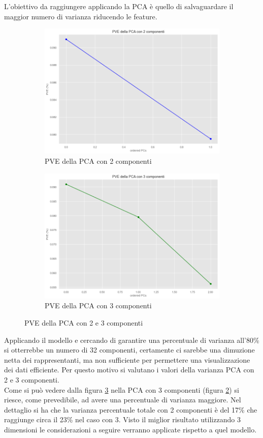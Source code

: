 L'obiettivo da raggiungere applicando la PCA è quello di salvaguardare il maggior numero di varianza riducendo le feature. 
\begin{figure}[h]
	\begin{subfigure}{.5\textwidth}
		\centering
		\includegraphics[width=.5\linewidth]{capitolo3/pca.png}
		\caption{PVE della PCA con 2 componenti}
		\label{fig:pca2d}
	\end{subfigure}%
	\begin{subfigure}{.5\textwidth}
		\centering
		\includegraphics[width=.5\linewidth]{capitolo3/pca_3.png}
		\caption{PVE della PCA con 3 componenti}
		\label{fig:pca3d}
	\end{subfigure}
	\caption{PVE della PCA con 2 e 3 componenti}
	\label{fig:pca}
\end{figure}
Applicando il modello e cercando di garantire una percentuale di varianza all'80\%  si otterrebbe un numero di 32 componenti, certamente ci sarebbe una dimuzione netta dei rappresentanti, ma non sufficiente per permettere una visualizzazione dei dati efficiente. Per questo motivo si valutano i valori della varianza PCA con 2 e 3 componenti.\\
Come si può vedere dalla figura \ref{fig:pca} nella PCA con 3 componenti (figura \ref{fig:pca3d}) si riesce, come prevedibile, ad avere una percentuale di varianza maggiore.
Nel dettaglio si ha che la varianza percentuale totale con 2 componenti è del 17\% che raggiunge circa il 23\% nel caso con 3. Visto il miglior risultato utilizzando 3 dimensioni le considerazioni a seguire verranno applicate rispetto a quel modello.

